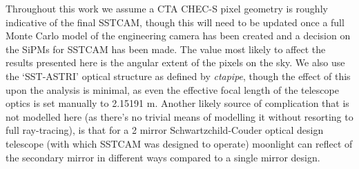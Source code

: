 Throughout this work we assume a CTA CHEC-S pixel geometry is roughly indicative of the final SSTCAM, though this will need to be updated once a full Monte Carlo model of the engineering camera has been created and a decision on the SiPMs for SSTCAM has been made. The value most likely to affect the results presented here is the angular extent of the pixels on the sky. We also use the `SST-ASTRI' optical structure as defined by \textit{ctapipe}, though the effect of this upon the analysis is minimal, as even the effective focal length of the telescope optics is set manually to 2.15191 m. Another likely source of complication that is not modelled here (as there's no trivial means of modelling it without resorting to full ray-tracing), is that for a 2 mirror Schwartzchild-Couder optical design telescope (with which SSTCAM was designed to operate) moonlight can reflect of the secondary mirror in different ways compared to a single mirror design.

\label{sec:examples}
